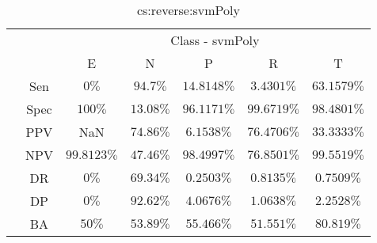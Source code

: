 \begin{table}[!ht]
	\centering
	\begin{tabular}{|c|c|c|c|c|c|c|}
		\cline{3-7}
		\multicolumn{2}{c|}{} & \multicolumn{5}{c|}{Class - svmPoly} \\ \cline{3-7}
		\multicolumn{2}{c|}{} & E & N & P & R & T \\ \hline
		\multirow{7}{*}{\rotatebox{90}{Statistics}} & Sen & $0\%$ & $94.7\%$ & $14.8148\%$ & $3.4301\%$ & $63.1579\%$ \\ \cline{2-7}
		 & Spec & $100\%$ & $13.08\%$ & $96.1171\%$ & $99.6719\%$ & $98.4801\%$ \\ \cline{2-7}
		 & PPV & NaN & $74.86\%$ & $6.1538\%$ & $76.4706\%$ & $33.3333\%$ \\ \cline{2-7}
		 & NPV & $99.8123\%$ & $47.46\%$ & $98.4997\%$ & $76.8501\%$ & $99.5519\%$ \\ \cline{2-7}
		 & DR & $0\%$ & $69.34\%$ & $0.2503\%$ & $0.8135\%$ & $0.7509\%$ \\ \cline{2-7}
		 & DP & $0\%$ & $92.62\%$ & $4.0676\%$ & $1.0638\%$ & $2.2528\%$ \\ \cline{2-7}
		 & BA & $50\%$ & $53.89\%$ & $55.466\%$ & $51.551\%$ & $80.819\%$ \\ \hline
	\end{tabular}
	\caption{cs:reverse:svmPoly}
	\label{tab:cs:reverse:svmPoly}
\end{table}
